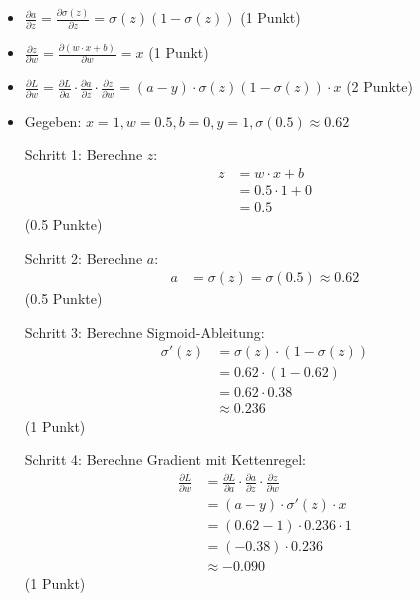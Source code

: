 \begin{itemize}
\item [b)] $\frac{\partial a}{\partial z} = \frac{\partial \sigma(z)}{\partial z} = \sigma(z)(1-\sigma(z))$ (1 Punkt)
\end{itemize}

\begin{itemize}
\item [c)] $\frac{\partial z}{\partial w} = \frac{\partial(w \cdot x + b)}{\partial w} = x$ (1 Punkt)
\end{itemize}

\begin{itemize}
\item [d)] $\frac{\partial L}{\partial w} = \frac{\partial L}{\partial a} \cdot \frac{\partial a}{\partial z} \cdot \frac{\partial z}{\partial w} = (a-y) \cdot \sigma(z)(1-\sigma(z)) \cdot x$ (2 Punkte)
\end{itemize}

\begin{itemize}
\item [e)] Gegeben: $x=1, w=0.5, b=0, y=1, \sigma(0.5) \approx 0.62$

Schritt 1: Berechne $z$:
\begin{align*}
z &= w \cdot x + b \\
&= 0.5 \cdot 1 + 0 \\
&= 0.5
\end{align*}
(0.5 Punkte)

Schritt 2: Berechne $a$:
\begin{align*}
a &= \sigma(z) = \sigma(0.5) \approx 0.62
\end{align*}
(0.5 Punkte)

Schritt 3: Berechne Sigmoid-Ableitung:
\begin{align*}
\sigma'(z) &= \sigma(z) \cdot (1 - \sigma(z)) \\
&= 0.62 \cdot (1 - 0.62) \\
&= 0.62 \cdot 0.38 \\
&\approx 0.236
\end{align*}
(1 Punkt)

Schritt 4: Berechne Gradient mit Kettenregel:
\begin{align*}
\frac{\partial L}{\partial w} &= \frac{\partial L}{\partial a} \cdot \frac{\partial a}{\partial z} \cdot \frac{\partial z}{\partial w} \\
&= (a - y) \cdot \sigma'(z) \cdot x \\
&= (0.62 - 1) \cdot 0.236 \cdot 1 \\
&= (-0.38) \cdot 0.236 \\
&\approx -0.090
\end{align*}
(1 Punkt)
\end{itemize}

